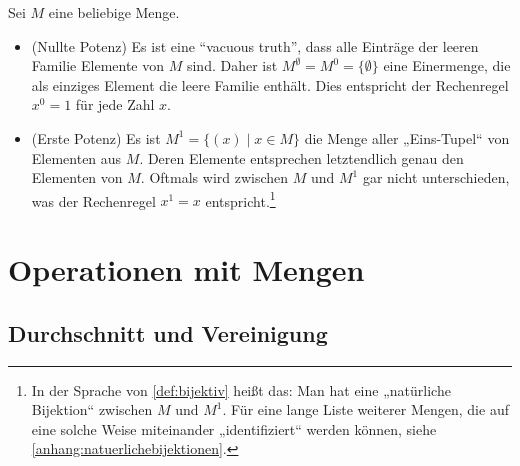 \begin{bem}
    Sei $M$ eine beliebige Menge.
    \begin{itemize}
        \item(Nullte Potenz) Es ist eine ``vacuous truth'', dass alle Einträge der leeren Familie Elemente von $M$ sind. Daher ist $M^\emptyset=M^0 = \{\emptyset\}$ eine Einermenge, die als einziges Element die leere Familie enthält. Dies entspricht der Rechenregel $x^0=1$ für jede Zahl $x$.
        \item(Erste Potenz) Es ist $M^1 = \{(x)\mid x\in M\}$ die Menge aller „Eins-Tupel“ von Elementen aus $M$. Deren Elemente entsprechen letztendlich genau den Elementen von $M$. Oftmals wird zwischen $M$ und $M^1$ gar nicht unterschieden, was der Rechenregel $x^1=x$ entspricht.\footnote{In der Sprache von \cref{def:bijektiv} heißt das: Man hat eine „natürliche Bijektion“ zwischen $M$ und $M^1$. Für eine lange Liste weiterer Mengen, die auf eine solche Weise miteinander „identifiziert“ werden können, siehe \cref{anhang:natuerlichebijektionen}.}
    \end{itemize}
\end{bem}





\section{Operationen mit Mengen} \label{sec:mengenop}


\subsection*{Durchschnitt und Vereinigung}


